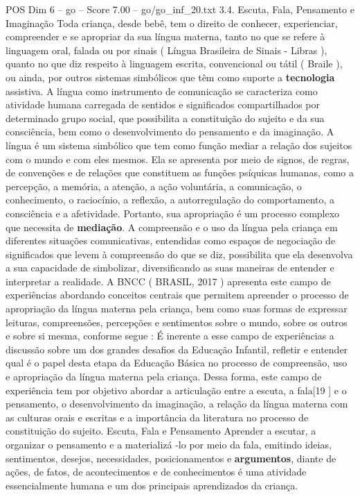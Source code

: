 \begin{textsample}{POS Dim 6 – go – Score 7.00 – go/go\_inf\_20.txt}  \label{ex:f6_pos_118}
3.4.
Escuta, Fala, Pensamento e Imaginação Toda criança, desde bebê, tem o direito de conhecer, experienciar, compreender e se apropriar da sua língua materna, tanto no que se refere à linguagem oral, falada ou por sinais ( Língua Brasileira de Sinais - Libras ), quanto no que diz respeito à linguagem escrita, convencional ou tátil ( Braile ), ou ainda, por outros sistemas simbólicos que têm como suporte a \textbf{tecnologia} assistiva.
A língua como instrumento de comunicação se caracteriza como atividade humana carregada de sentidos e significados compartilhados por determinado grupo social, que possibilita a constituição do sujeito e da sua consciência, bem como o desenvolvimento do pensamento e da imaginação.
A língua é um sistema simbólico que tem como função mediar a relação dos sujeitos com o mundo e com eles mesmos.
Ela se apresenta por meio de signos, de regras, de convenções e de relações que constituem as funções psíquicas humanas, como a percepção, a memória, a atenção, a ação voluntária, a comunicação, o conhecimento, o raciocínio, a reflexão, a autorregulação do comportamento, a consciência e a afetividade.
Portanto, sua apropriação é um processo complexo que necessita de \textbf{mediação}.
A compreensão e o uso da língua pela criança em diferentes situações comunicativas, entendidas como espaços de negociação de significados que levem à compreensão do que se diz, possibilita que ela desenvolva a sua capacidade de simbolizar, diversificando as suas maneiras de entender e interpretar a realidade.
A BNCC ( BRASIL, 2017 ) apresenta este campo de experiências abordando conceitos centrais que permitem apreender o processo de apropriação da língua materna pela criança, bem como suas formas de expressar leituras, compreensões, percepções e sentimentos sobre o mundo, sobre os outros e sobre si mesma, conforme segue : É inerente a esse campo de experiências a discussão sobre um dos grandes desafios da Educação Infantil, refletir e entender qual é o papel desta etapa da Educação Básica no processo de compreensão, uso e apropriação da língua materna pela criança.
Dessa forma, este campo de experiência tem por objetivo abordar a articulação entre a escuta, a fala[19 ] e o pensamento, o desenvolvimento da imaginação, a relação da língua materna com as culturas orais e escritas e a importância da literatura no processo de constituição do sujeito.
Escuta, Fala e Pensamento Aprender a escutar, a organizar o pensamento e a materializá -lo por meio da fala, emitindo ideias, sentimentos, desejos, necessidades, posicionamentos e \textbf{argumentos}, diante de ações, de fatos, de acontecimentos e de conhecimentos é uma atividade essencialmente humana e um dos principais aprendizados da criança.

\end{textsample}
